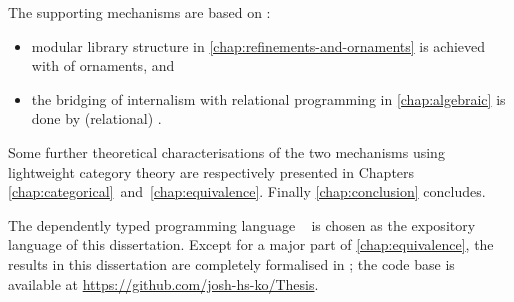 The supporting mechanisms are based on :
\begin{itemize}
\item modular library structure in \autoref{chap:refinements-and-ornaments} is achieved with  of ornaments, and
\item the bridging of internalism with relational programming in \autoref{chap:algebraic} is done by (relational) .
\end{itemize}
Some further theoretical characterisations of the two mechanisms using lightweight category theory are respectively presented in Chapters \ref{chap:categorical}~and~\ref{chap:equivalence}.
Finally \autoref{chap:conclusion} concludes.

The dependently typed programming language \Agda~\citep{Norell-thesis, Norell-Agda, Bove-dependent-types-at-work} is chosen as the expository language of this dissertation.
Except for a major part of \autoref{chap:equivalence}, the results in this dissertation are completely formalised in \Agda; the code base is available at \url{https://github.com/josh-hs-ko/Thesis}.


\vskip1pt
